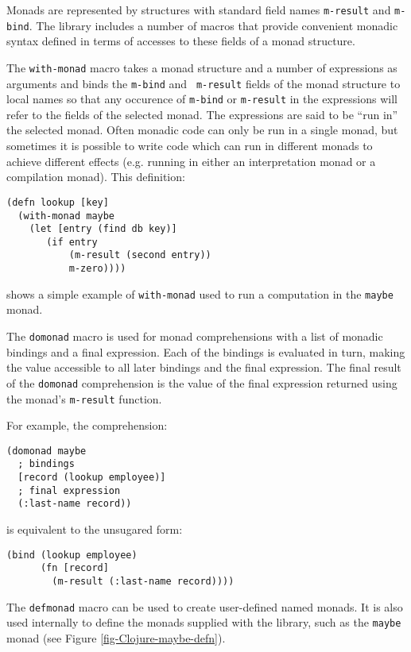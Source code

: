 \documentclass[natbib,10pt]{sigplanconf}
\begin{document}
Monads are represented by structures with standard field names
{\tt m-result} and {\tt m-bind}. The library includes a number of
macros that provide convenient monadic syntax defined in terms
of accesses to these fields of a monad structure.

The {\tt with-monad} macro takes a monad structure and a number of
expressions as arguments and binds the {\tt m-bind} and {\tt
  m-result} fields of the monad structure to local names so that any
occurence of {\tt m-bind} or {\tt m-result} in the expressions
will refer to the fields of the selected monad.  The expressions are
said to be ``run in'' the selected monad.  Often monadic code can only
be run in a single monad, but sometimes it is possible to write code
which can run in different monads to achieve different effects
(e.g. running in either an interpretation monad or a compilation
monad).  This definition:
\begin{verbatim}
(defn lookup [key]
  (with-monad maybe
    (let [entry (find db key)]
       (if entry
           (m-result (second entry))
           m-zero))))
\end{verbatim}
shows a simple example of {\tt with-monad} used to run a computation
in the {\tt maybe} monad.

The {\tt domonad} macro is used for monad comprehensions with a list
of monadic bindings and a final expression.  Each of the bindings is
evaluated in turn, making the value accessible to all later bindings
and the final expression.  The final result of the {\tt domonad}
comprehension is the value of the final expression returned using
the monad's {\tt m-result} function.

\pagebreak

For example, the comprehension:
\begin{verbatim}
(domonad maybe
  ; bindings
  [record (lookup employee)]
  ; final expression
  (:last-name record))
\end{verbatim}
is equivalent to the unsugared form:
\begin{verbatim}
(bind (lookup employee)
      (fn [record]
        (m-result (:last-name record))))
\end{verbatim}

The {\tt defmonad} macro can be used to create user-defined named
monads.  It is also used internally to define the monads supplied
with the library, such as the {\tt maybe} monad 
(see Figure \ref{fig-Clojure-maybe-defn}).
\end{document}
